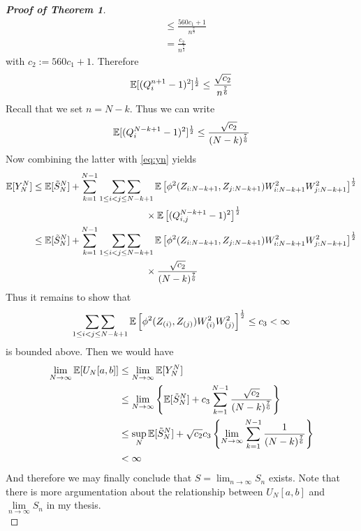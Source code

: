 \begin{proof}[\textbf{Proof of Theorem 1}]
\begin{align*}
		&\leq \frac{560c_1+1}{n^\frac{7}{3}}\\
		&= \frac{c_2}{n^\frac{7}{3}}
	\end{align*}
	with $c_2 := 560c_1+1$. Therefore
	\begin{equation*}
		\mathbb{E}[(Q_i^{n+1} - 1)^2]^\frac{1}{2} \leq \frac{\sqrt{c_2}}{n^\frac{7}{6}}
	\end{equation*}
	Recall that we set $n=N-k$. Thus we can write 
	\begin{equation*}
		\mathbb{E}[(Q_i^{N-k+1} - 1)^2]^\frac{1}{2} \leq \frac{\sqrt{c_2}}{(N-k)^\frac{7}{6}}
	\end{equation*}
	Now combining the latter with \eqref{eq:yn} yields 
	\begin{align*}
		\mathbb{E}[Y_N^N] &\leq  \mathbb{E}[\tilde{S}_{N}^N] + \sum_{k=1}^{N-1} \mathop{\sum\sum}\limits_{1\leq i<j\leq N-k+1}\mathbb{E}\left[\phi^2(Z_{i:N-k+1}, Z_{j:N-k+1}) W^2_{i:N-k+1} W^2_{j:N-k+1}\right]^{\frac{1}{2}}\\
		&\qquad\qquad\qquad\qquad\qquad\qquad \times \mathbb{E}\left[(Q_{i,j}^{N-k+1} - 1)^2\right]^{\frac{1}{2}}\\
		&\leq \mathbb{E}[\tilde{S}_{N}^N] + \sum_{k=1}^{N-1} \mathop{\sum\sum}\limits_{1\leq i<j\leq N-k+1}\mathbb{E}\left[\phi^2(Z_{i:N-k+1}, Z_{j:N-k+1}) W^2_{i:N-k+1} W^2_{j:N-k+1}\right]^{\frac{1}{2}}\\
		&\qquad\qquad\qquad\qquad\qquad\qquad \times \frac{\sqrt{c_2}}{(N-k)^\frac{7}{6}}
	\end{align*}
	Thus it remains to show that 
	$$\mathop{\sum\sum}\limits_{1\leq i<j\leq N-k+1}\mathbb{E}\left[\phi^2(Z_{(i)}, Z_{(j)}) W^2_{(i)} W^2_{(j)}\right]^{\frac{1}{2}} \leq c_3 < \infty$$
	is bounded above. Then we would have 
	\begin{align*}
		\lim\limits_{N\to\infty}\mathbb{E}[U_N[a,b]]
		&\leq \lim\limits_{N\to\infty}\mathbb{E}[Y_N^N]\\
		&\leq \lim\limits_{N\to\infty} \left\{\mathbb{E}[\tilde{S}_{N}^N] + c_3\sum_{k=1}^{N-1}\frac{\sqrt{c_2}}{(N-k)^\frac{7}{6}}\right\}\\
		&\leq \sup\limits_{N}\mathbb{E}[\tilde{S}_{N}^N] + \sqrt{c_2}c_3 \left\{\lim\limits_{N\to\infty}\sum_{k=1}^{N-1}\frac{1}{(N-k)^\frac{7}{6}}\right\}\\
		&< \infty
	\end{align*}
	And therefore we may finally conclude that $S = \lim_{n\to\infty} S_n$ exists. Note that there is more argumentation about the relationship between $U_N[a,b]$ and $\lim\limits_{n\to\infty} S_n$ in my thesis.\\
\end{proof}